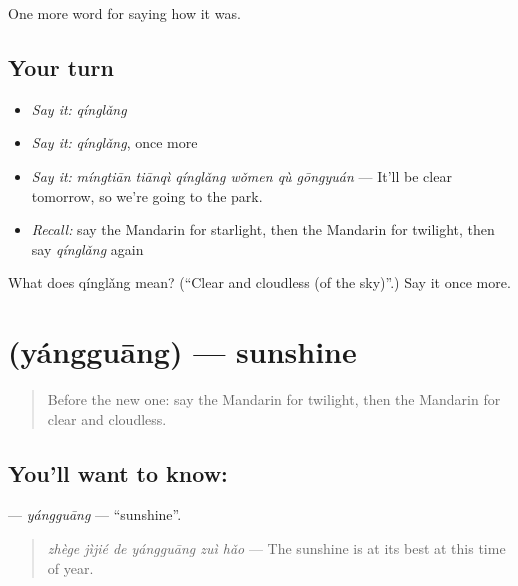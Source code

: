 \begin{grammarlens}[title={What you've built}]
One more word for saying how it was.
\end{grammarlens}

\subsection*{Your turn}
\begin{itemize}
\raggedright
  \item \emph{Say it:} \emph{qínglǎng}
  \item \emph{Say it:} \emph{qínglǎng}, once more
  \item \emph{Say it:} \emph{míngtiān tiānqì qínglǎng wǒmen qù gōngyuán} — It'll be clear tomorrow, so we're going to the park.
  \item \emph{Recall:} say the Mandarin for starlight, then the Mandarin for twilight, then say \emph{qínglǎng} again
\end{itemize}

\begin{tcolorbox}[breakable,colback=teal!4,colframe=teal!35!black,title={Before you move on}]
What does qínglǎng mean? (\textquotedblleft{}Clear and cloudless (of the sky)\textquotedblright{}.) Say it once more.
\end{tcolorbox}
\section[\texorpdfstring{\zh{阳光} (yángguāng)}{阳光 (yángguāng)}]{ (yángguāng) — sunshine}

\label{lesson:ZH-C518-yangguang}



\begin{quote}
Before the new one: say the Mandarin for twilight, then the Mandarin for clear and cloudless.
\end{quote}

\subsection*{You'll want to know: }
\textbf{} — \emph{yángguāng} — \textquotedblleft{}sunshine\textquotedblright{}.

\begin{quote}
\textbf{} \emph{zhège jìjié de yángguāng zuì hǎo} — The sunshine is at its best at this time of year.
\end{quote}

